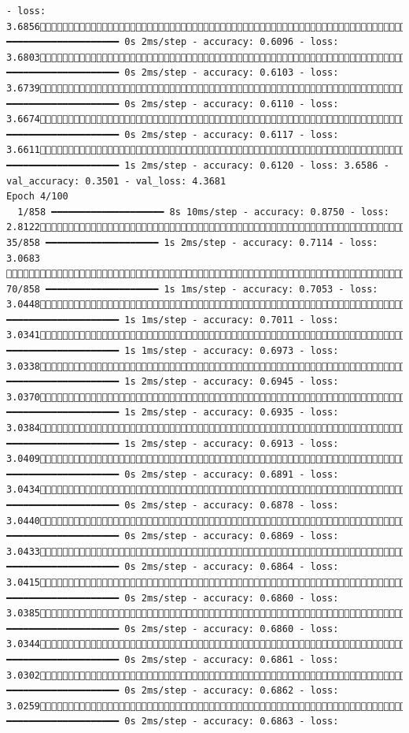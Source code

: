 \documentclass[
  letterpaper,
  DIV=11,
  numbers=noendperiod]{scrartcl}
\begin{document}
\begin{verbatim}
- loss: 3.6856737/858 ━━━━━━━━━━━━━━━━━━━━ 0s 2ms/step - accuracy: 0.6096 - loss: 3.6803773/858 ━━━━━━━━━━━━━━━━━━━━ 0s 2ms/step - accuracy: 0.6103 - loss: 3.6739810/858 ━━━━━━━━━━━━━━━━━━━━ 0s 2ms/step - accuracy: 0.6110 - loss: 3.6674845/858 ━━━━━━━━━━━━━━━━━━━━ 0s 2ms/step - accuracy: 0.6117 - loss: 3.6611858/858 ━━━━━━━━━━━━━━━━━━━━ 1s 2ms/step - accuracy: 0.6120 - loss: 3.6586 - val_accuracy: 0.3501 - val_loss: 4.3681
Epoch 4/100
  1/858 ━━━━━━━━━━━━━━━━━━━━ 8s 10ms/step - accuracy: 0.8750 - loss: 2.8122 35/858 ━━━━━━━━━━━━━━━━━━━━ 1s 2ms/step - accuracy: 0.7114 - loss: 3.0683  70/858 ━━━━━━━━━━━━━━━━━━━━ 1s 1ms/step - accuracy: 0.7053 - loss: 3.0448108/858 ━━━━━━━━━━━━━━━━━━━━ 1s 1ms/step - accuracy: 0.7011 - loss: 3.0341145/858 ━━━━━━━━━━━━━━━━━━━━ 1s 1ms/step - accuracy: 0.6973 - loss: 3.0338170/858 ━━━━━━━━━━━━━━━━━━━━ 1s 2ms/step - accuracy: 0.6945 - loss: 3.0370182/858 ━━━━━━━━━━━━━━━━━━━━ 1s 2ms/step - accuracy: 0.6935 - loss: 3.0384215/858 ━━━━━━━━━━━━━━━━━━━━ 1s 2ms/step - accuracy: 0.6913 - loss: 3.0409252/858 ━━━━━━━━━━━━━━━━━━━━ 0s 2ms/step - accuracy: 0.6891 - loss: 3.0434286/858 ━━━━━━━━━━━━━━━━━━━━ 0s 2ms/step - accuracy: 0.6878 - loss: 3.0440319/858 ━━━━━━━━━━━━━━━━━━━━ 0s 2ms/step - accuracy: 0.6869 - loss: 3.0433351/858 ━━━━━━━━━━━━━━━━━━━━ 0s 2ms/step - accuracy: 0.6864 - loss: 3.0415388/858 ━━━━━━━━━━━━━━━━━━━━ 0s 2ms/step - accuracy: 0.6860 - loss: 3.0385424/858 ━━━━━━━━━━━━━━━━━━━━ 0s 2ms/step - accuracy: 0.6860 - loss: 3.0344459/858 ━━━━━━━━━━━━━━━━━━━━ 0s 2ms/step - accuracy: 0.6861 - loss: 3.0302495/858 ━━━━━━━━━━━━━━━━━━━━ 0s 2ms/step - accuracy: 0.6862 - loss: 3.0259532/858 ━━━━━━━━━━━━━━━━━━━━ 0s 2ms/step - accuracy: 0.6863 - loss: 
\end{verbatim}
\end{document}

